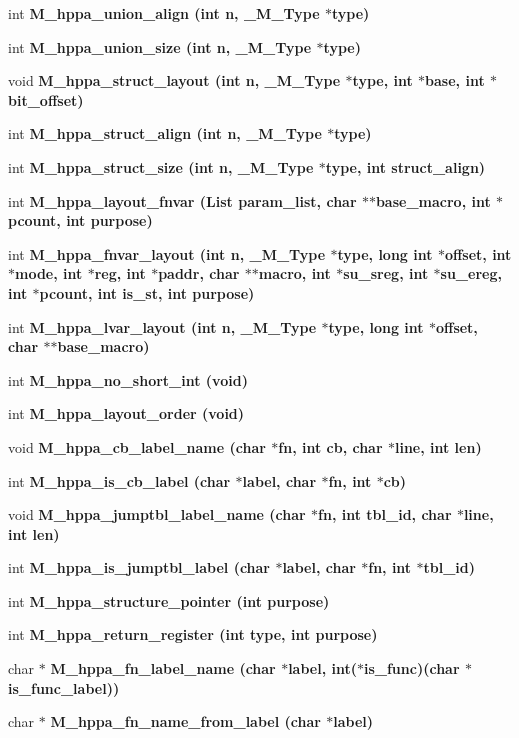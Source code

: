 \begin{CompactItemize}
int \bf{M\_\-hppa\_\-union\_\-align} (int n, \bf{\_\-M\_\-Type} $\ast$type)
\item 
int \bf{M\_\-hppa\_\-union\_\-size} (int n, \bf{\_\-M\_\-Type} $\ast$type)
\item 
void \bf{M\_\-hppa\_\-struct\_\-layout} (int n, \bf{\_\-M\_\-Type} $\ast$type, int $\ast$base, int $\ast$bit\_\-offset)
\item 
int \bf{M\_\-hppa\_\-struct\_\-align} (int n, \bf{\_\-M\_\-Type} $\ast$type)
\item 
int \bf{M\_\-hppa\_\-struct\_\-size} (int n, \bf{\_\-M\_\-Type} $\ast$type, int struct\_\-align)
\item 
int \bf{M\_\-hppa\_\-layout\_\-fnvar} (\bf{List} param\_\-list, char $\ast$$\ast$base\_\-macro, int $\ast$pcount, int purpose)
\item 
int \bf{M\_\-hppa\_\-fnvar\_\-layout} (int n, \bf{\_\-M\_\-Type} $\ast$type, long int $\ast$offset, int $\ast$\bf{mode}, int $\ast$reg, int $\ast$paddr, char $\ast$$\ast$macro, int $\ast$su\_\-sreg, int $\ast$su\_\-ereg, int $\ast$pcount, int is\_\-st, int purpose)
\item 
int \bf{M\_\-hppa\_\-lvar\_\-layout} (int n, \bf{\_\-M\_\-Type} $\ast$type, long int $\ast$offset, char $\ast$$\ast$base\_\-macro)
\item 
int \bf{M\_\-hppa\_\-no\_\-short\_\-int} (void)
\item 
int \bf{M\_\-hppa\_\-layout\_\-order} (void)
\item 
void \bf{M\_\-hppa\_\-cb\_\-label\_\-name} (char $\ast$fn, int cb, char $\ast$line, int len)
\item 
int \bf{M\_\-hppa\_\-is\_\-cb\_\-label} (char $\ast$label, char $\ast$fn, int $\ast$cb)
\item 
void \bf{M\_\-hppa\_\-jumptbl\_\-label\_\-name} (char $\ast$fn, int tbl\_\-id, char $\ast$line, int len)
\item 
int \bf{M\_\-hppa\_\-is\_\-jumptbl\_\-label} (char $\ast$label, char $\ast$fn, int $\ast$tbl\_\-id)
\item 
int \bf{M\_\-hppa\_\-structure\_\-pointer} (int purpose)
\item 
int \bf{M\_\-hppa\_\-return\_\-register} (int type, int purpose)
\item 
char $\ast$ \bf{M\_\-hppa\_\-fn\_\-label\_\-name} (char $\ast$label, int($\ast$is\_\-func)(char $\ast$is\_\-func\_\-label))
\item 
char $\ast$ \bf{M\_\-hppa\_\-fn\_\-name\_\-from\_\-label} (char $\ast$label)
\item 
$$
\end{CompactItemize}
